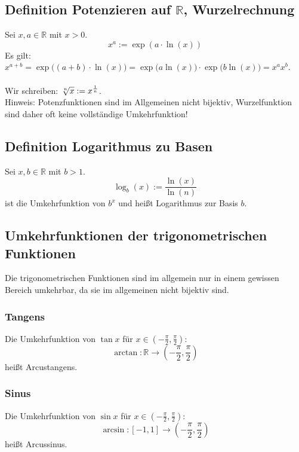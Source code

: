 \documentclass[halfparscip]{scrartcl}
\newcounter{subsection2}
\begin{document}
\subsection{Definition Potenzieren auf $\mathbb{R}$, Wurzelrechnung}
Sei $x,a \in \mathbb{R}$ mit $x > 0$.
\begin{equation*}
	x^a := \exp(a \cdot \ln(x))
\end{equation*}
Es gilt: $x^{a+b} = \exp\big((a+b) \cdot \ln(x)\big) = \exp\big(a \ln(x)\big)\cdot \exp\big(b \ln(x)\big) = x^ax^b$.\\\\
Wir schreiben: $\sqrt[\uproot{1}n]{x} := x^\frac{1}{n}$.\\
Hinweis: Potenzfunktionen sind im Allgemeinen nicht bijektiv, Wurzelfunktion sind daher oft keine vollständige Umkehrfunktion!

\subsection*{Definition Logarithmus zu Basen}
Sei $x, b \in \mathbb{R}$ mit $b > 1$.
\begin{equation*}
	\log_b(x) := \frac{\ln(x)}{\ln(n)}
\end{equation*}
ist die Umkehrfunktion von $b^x$ und heißt Logarithmus zur Basis $b$.

\subsection*{Umkehrfunktionen der trigonometrischen Funktionen}
Die trigonometrischen Funktionen sind im allgemein nur in einem gewissen Bereich umkehrbar, da sie im allgemeinen nicht bijektiv sind.
\subsubsection*{Tangens}
Die Umkehrfunktion von $\tan x$ für $x \in \left(-\frac{\pi}{2},\frac{\pi}{2}\right)$:
\begin{equation*}
	\arctan : \mathbb{R} \rightarrow \left(-\frac{\pi}{2},\frac{\pi}{2}\right)
\end{equation*}
heißt Arcustangens.
\subsubsection*{Sinus}
Die Umkehrfunktion von $\sin x$ für $x \in \left(-\frac{\pi}{2},\frac{\pi}{2}\right)$:
\begin{equation*}
\arcsin : \left[-1,1\right] \rightarrow \left(-\frac{\pi}{2},\frac{\pi}{2}\right)
\end{equation*}
heißt Arcussinus.
\end{document}

